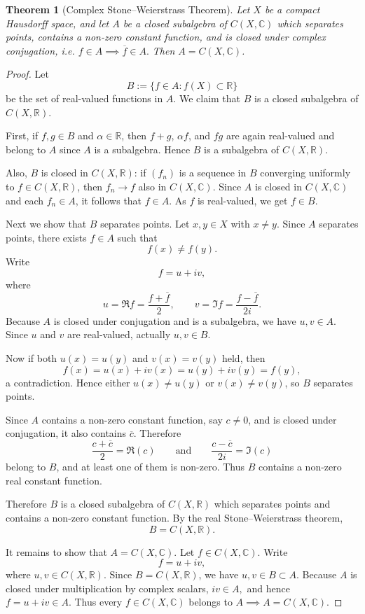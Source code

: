 \documentclass[12pt]{article}
\newtheorem{theorem}{Theorem}
\begin{document}
\begin{theorem}[Complex Stone--Weierstrass Theorem]
Let $X$ be a compact Hausdorff space, and let $A$ be a closed subalgebra of $C(X,\mathbb{C})$ which separates points, contains a non-zero constant function, and is closed under complex conjugation, i.e. $f \in A \implies \overline{f} \in A.$
Then $A = C(X,\mathbb{C})$.
\end{theorem}

\begin{proof}
Let
\[
B:=\{f \in A : f(X)\subset \mathbb{R}\}
\]
be the set of real-valued functions in $A$. We claim that $B$ is a closed subalgebra of
$C(X,\mathbb{R})$.

First, if $f,g \in B$ and $\alpha \in \mathbb{R}$, then $f+g$, $\alpha f$, and $fg$ are again
real-valued and belong to $A$ since $A$ is a subalgebra. Hence $B$ is a subalgebra of
$C(X,\mathbb{R})$.

Also, $B$ is closed in $C(X,\mathbb{R})$: if $(f_n)$ is a sequence in $B$ converging
uniformly to $f \in C(X,\mathbb{R})$, then $f_n \to f$ also in $C(X,\mathbb{C})$.
Since $A$ is closed in $C(X,\mathbb{C})$ and each $f_n \in A$, it follows that $f \in A$.
As $f$ is real-valued, we get $f \in B$.

Next we show that $B$ separates points. Let $x,y \in X$ with $x \neq y$. Since $A$
separates points, there exists $f \in A$ such that
\[
f(x)\neq f(y).
\]
Write
\[
f=u+iv,
\]
where
\[
u=\Re f=\frac{f+\overline f}{2},
\qquad
v=\Im f=\frac{f-\overline f}{2i}.
\]
Because $A$ is closed under conjugation and is a subalgebra, we have $u,v \in A$.
Since $u$ and $v$ are real-valued, actually $u,v \in B$.

Now if both $u(x)=u(y)$ and $v(x)=v(y)$ held, then
\[
f(x)=u(x)+iv(x)=u(y)+iv(y)=f(y),
\]
a contradiction. Hence either $u(x)\neq u(y)$ or $v(x)\neq v(y)$, so $B$ separates points.

Since $A$ contains a non-zero constant function, say $c \neq 0$, and is closed under
conjugation, it also contains $\overline c$. Therefore
\[
\frac{c+\overline c}{2}=\Re(c)
\qquad \text{and} \qquad
\frac{c-\overline c}{2i}=\Im(c)
\]
belong to $B$, and at least one of them is non-zero. Thus $B$ contains a non-zero real
constant function.

Therefore $B$ is a closed subalgebra of $C(X,\mathbb{R})$ which separates points and
contains a non-zero constant function. By the real Stone--Weierstrass theorem,
\[
B=C(X,\mathbb{R}).
\]

It remains to show that $A=C(X,\mathbb{C})$. Let $f \in C(X,\mathbb{C})$. Write
\[
f=u+iv,
\]
where $u,v \in C(X,\mathbb{R})$. Since $B=C(X,\mathbb{R})$, we have $u,v \in B \subset A$.
Because $A$ is closed under multiplication by complex scalars, $iv \in A,$ and hence $f=u+iv \in A.$
Thus every $f \in C(X,\mathbb{C})$ belongs to $A \implies A=C(X,\mathbb{C}).$
\end{proof}
\end{document}
